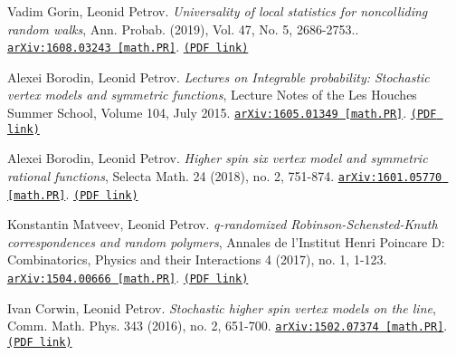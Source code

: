 \begin{etaremune}
\item 
Vadim Gorin, Leonid Petrov.
\emph{Universality of local statistics for noncolliding random walks}, Ann. Probab. (2019), Vol. 47, No. 5, 2686-2753.. 
\href{https://arxiv.org/abs/1608.03243}{\texttt{arXiv:1608.03243 [math.PR]}}. \href{https://storage.lpetrov.cc/research_files/Petrov-publ/22-publ-petrov-uva-j.pdf}{\texttt{(PDF link)}}



\item 
Alexei Borodin, Leonid Petrov.
\emph{Lectures on Integrable probability: Stochastic vertex models and symmetric functions}, Lecture Notes of the Les Houches Summer School, Volume 104, July 2015. 
\href{https://arxiv.org/abs/1605.01349}{\texttt{arXiv:1605.01349 [math.PR]}}. \href{https://storage.lpetrov.cc/research_files/Petrov-publ/21-publ-petrov-uva.pdf}{\texttt{(PDF link)}}



\item 
Alexei Borodin, Leonid Petrov.
\emph{Higher spin six vertex model and symmetric rational functions}, Selecta Math. 24 (2018), no. 2, 751-874. 
\href{https://arxiv.org/abs/1601.05770}{\texttt{arXiv:1601.05770 [math.PR]}}. \href{https://storage.lpetrov.cc/research_files/Petrov-publ/20-publ-petrov-uva.pdf}{\texttt{(PDF link)}}









\item 
Konstantin Matveev, Leonid Petrov.
\emph{q-randomized Robinson-Schensted-Knuth correspondences and random polymers}, Annales de l’Institut Henri Poincare D: Combinatorics, Physics and their Interactions 4 (2017), no. 1, 1-123. 
\href{https://arxiv.org/abs/1504.00666}{\texttt{arXiv:1504.00666 [math.PR]}}. \href{https://storage.lpetrov.cc/research_files/Petrov-publ/19-publ-petrov-uva.pdf}{\texttt{(PDF link)}}





\item 
Ivan Corwin, Leonid Petrov.
\emph{Stochastic higher spin vertex models on the line}, Comm. Math. Phys. 343 (2016), no. 2, 651-700. 
\href{https://arxiv.org/abs/1502.07374}{\texttt{arXiv:1502.07374 [math.PR]}}. \href{https://storage.lpetrov.cc/research_files/Petrov-publ/18-publ-petrov-uva.pdf}{\texttt{(PDF link)}}














\end{etaremune}

